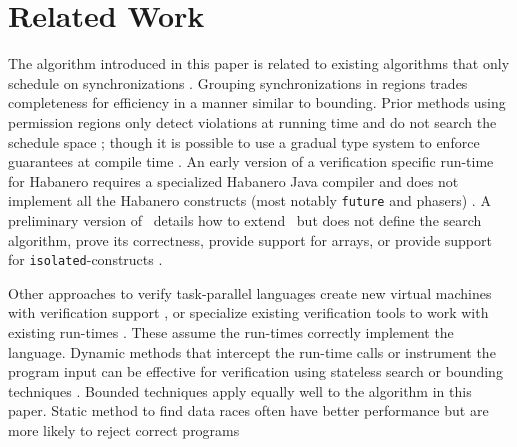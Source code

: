 \section{Related Work}

The algorithm introduced in this paper is related to existing algorithms that only
schedule on synchronizations
\cite{Vakkalanka:2008:DVM:1427782.1427794, conf/pldi/MusuvathiQ07, Emmi:2011:DS:1926385.1926432, conf/popl/Godefroid97, Fasttrack}. Grouping synchronizations in regions trades
completeness for efficiency in a manner similar to bounding. Prior methods using permission regions only detect violations at running time and do not search the schedule space \cite{Westbrook:2011:PRR:2341616.2341627}; though it is possible to use a gradual type system to enforce guarantees at compile time \cite{Westbrook:2012:PPR:2367163.2367201}. An early version of a verification
specific run-time for Habanero requires a specialized Habanero Java
compiler and does not implement all the Habanero constructs (most
notably \texttt{future} and phasers)
\cite{Anderson:2014:JVH:2557833.2560582}. A preliminary version of
\jpfhj\ details how to extend \jpf\ but does not define the search
algorithm, prove its correctness, provide support for arrays, or
provide support for \texttt{isolated}-constructs
\cite{Anderson:2015:JVH:2693208.2693245}.

Other approaches to verify task-parallel languages create new virtual
machines with verification support \cite{chapel}, or specialize
existing verification tools to work with existing run-times
\cite{conf:icst:GligoricMM12}. These assume the run-times correctly
implement the language. Dynamic methods that intercept the run-time
calls or instrument the program input can be effective for
verification using stateless search or bounding techniques
\cite{conf/pldi/MusuvathiQ07, Emmi:2011:DS:1926385.1926432}. Bounded techniques apply equally well to the algorithm in this paper. Static method to find data races often have better performance but are more likely to reject correct programs

